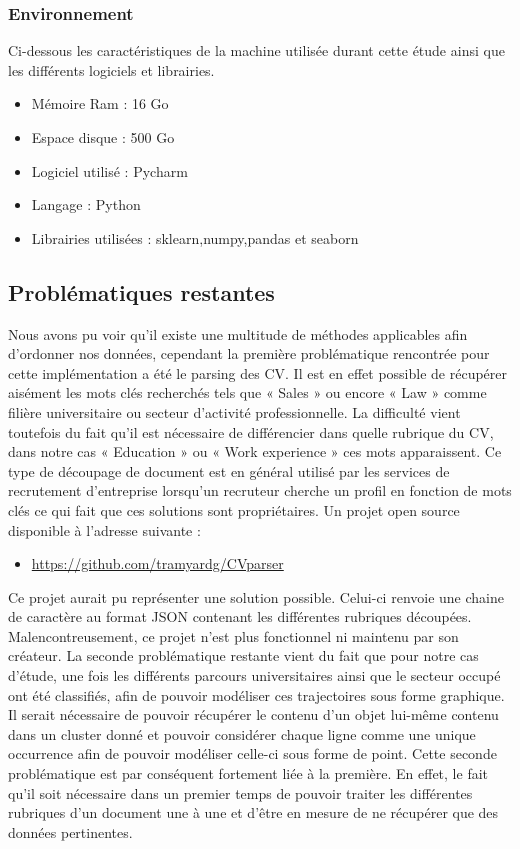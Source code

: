 \documentclass[memoire.tex]{subfiles}
\begin{document}
\subsubsection{Environnement}
Ci-dessous les caractéristiques de la machine utilisée durant cette étude ainsi que les différents logiciels et librairies.
\begin{itemize}
\item Mémoire Ram : 16 Go
\item Espace disque : 500 Go
\item Logiciel utilisé : Pycharm
\item Langage : Python
\item Librairies utilisées : sklearn,numpy,pandas et seaborn
\end{itemize}
\newpage
\subsection{Problématiques restantes}
Nous avons pu voir qu’il existe une multitude de méthodes applicables afin d’ordonner nos données, cependant la première problématique rencontrée pour cette implémentation a été le parsing des CV. Il est en effet possible de récupérer aisément les mots clés recherchés tels que « Sales » ou encore « Law » comme filière universitaire ou secteur d’activité professionnelle. La difficulté vient toutefois du fait qu’il est nécessaire de différencier dans quelle rubrique du CV, dans notre cas « Education » ou « Work experience » ces mots apparaissent. Ce type de découpage de document est en général utilisé par les services de recrutement d’entreprise lorsqu’un recruteur cherche un profil en fonction de mots clés ce qui fait que ces solutions sont propriétaires. Un projet open source disponible à l’adresse suivante :
\begin{itemize}
\item \url{https://github.com/tramyardg/CVparser}
\end{itemize}

Ce projet aurait pu représenter une solution possible. Celui-ci renvoie une chaine de caractère au format JSON contenant les différentes rubriques découpées. Malencontreusement, ce projet n’est plus fonctionnel ni maintenu par son créateur. 
La seconde problématique restante vient du fait que pour notre cas d’étude, une fois les différents parcours universitaires ainsi que le secteur occupé ont été classifiés, afin de pouvoir modéliser ces trajectoires sous forme graphique. Il serait nécessaire de pouvoir récupérer le contenu d’un objet lui-même contenu dans un cluster donné et pouvoir considérer chaque ligne comme une unique occurrence afin de pouvoir modéliser celle-ci sous forme de point. Cette seconde problématique est par conséquent fortement liée à la première. En effet, le fait qu’il soit nécessaire dans un premier temps de pouvoir traiter les différentes rubriques d’un document une à une et d’être en mesure de ne récupérer que des données pertinentes. 
\newpage
\end{document}
